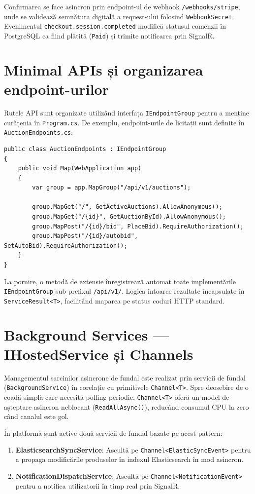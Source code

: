 Confirmarea se face asincron prin endpoint-ul de webhook \texttt{/webhooks/stripe}, unde se validează semnătura digitală a request-ului folosind \texttt{WebhookSecret}. Evenimentul \texttt{checkout.session.completed} modifică statusul comenzii în PostgreSQL ca fiind plătită (\texttt{Paid}) și trimite notificarea prin SignalR.

\section{Minimal APIs și organizarea endpoint-urilor}

Rutele API sunt organizate utilizând interfața \texttt{IEndpointGroup} pentru a menține curățenia în \texttt{Program.cs}. De exemplu, endpoint-urile de licitații sunt definite în \texttt{AuctionEndpoints.cs}:
\begin{lstlisting}[language={[sharp]C}]
public class AuctionEndpoints : IEndpointGroup
{
    public void Map(WebApplication app)
    {
        var group = app.MapGroup("/api/v1/auctions");
        
        group.MapGet("/", GetActiveAuctions).AllowAnonymous();
        group.MapGet("/{id}", GetAuctionById).AllowAnonymous();
        group.MapPost("/{id}/bid", PlaceBid).RequireAuthorization();
        group.MapPost("/{id}/autobid", SetAutoBid).RequireAuthorization();
    }
}
\end{lstlisting}

La pornire, o metodă de extensie înregistrează automat toate implementările \texttt{IEndpointGroup} sub prefixul \texttt{/api/v1/}. Logica întoarce rezultate încapsulate în \texttt{ServiceResult<T>}, facilitând maparea pe status coduri HTTP standard.

\section{Background Services --- IHostedService și Channels}

Managementul sarcinilor asincrone de fundal este realizat prin servicii de fundal (\texttt{BackgroundService}) în corelație cu primitivele \texttt{Channel<T>}. Spre deosebire de o coadă simplă care necesită polling periodic, \texttt{Channel<T>} oferă un model de așteptare asincron neblocant (\texttt{ReadAllAsync()}), reducând consumul CPU la zero când canalul este gol.

În platformă sunt active două servicii de fundal bazate pe acest pattern:
\begin{enumerate}
    \item \textbf{ElasticsearchSyncService}: Ascultă pe \texttt{Channel<ElasticSyncEvent>} pentru a propaga modificările produselor în indexul Elasticsearch în mod asincron.
    \item \textbf{NotificationDispatchService}: Ascultă pe \texttt{Channel<NotificationEvent>} pentru a notifica utilizatorii în timp real prin SignalR.
\end{enumerate}

